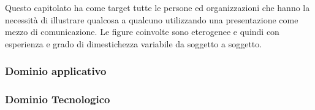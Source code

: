 Questo capitolato ha come target tutte le persone ed organizzazioni che hanno la necessità di illustrare qualcosa a qualcuno utilizzando una presentazione come mezzo di comunicazione.
Le figure coinvolte sono eterogenee e quindi con esperienza e grado di dimestichezza variabile da soggetto a soggetto. 

\subsubsection{Dominio applicativo}


\subsubsection{Dominio Tecnologico}


